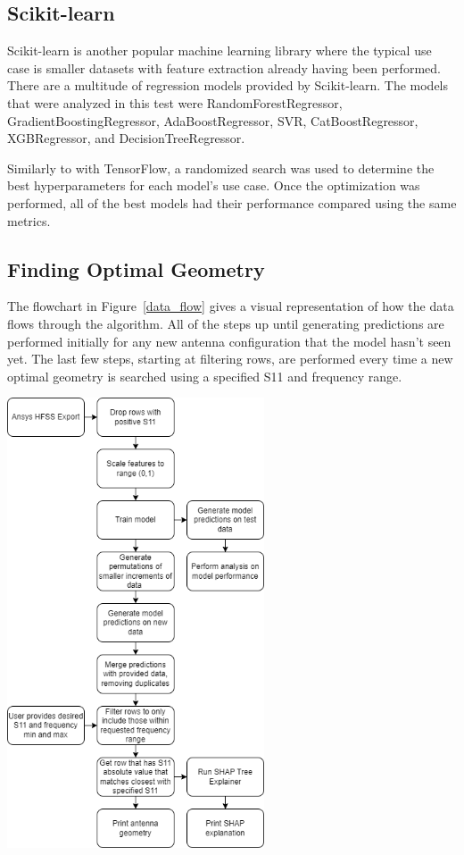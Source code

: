 \documentclass[lettersize,journal]{IEEEtran}
\newenvironment{Figure}
    {\par\medskip\noindent\minipage{\linewidth}}
    {\endminipage\par\medskip}
\begin{document}
\subsection{Scikit-learn}
Scikit-learn is another popular machine learning library where the typical use case is smaller datasets with feature extraction already having been performed. There are a multitude of regression models provided by Scikit-learn. The models that were analyzed in this test were RandomForestRegressor, GradientBoostingRegressor, AdaBoostRegressor, SVR, CatBoostRegressor, XGBRegressor, and DecisionTreeRegressor.

Similarly to with TensorFlow, a randomized search was used to determine the best hyperparameters for each model's use case. Once the optimization was performed, all of the best models had their performance compared using the same metrics. 

\subsection{Finding Optimal Geometry}
The flowchart in Figure~\ref{data_flow} gives a visual representation of how the data flows through the algorithm. All of the steps up until generating predictions are performed initially for any new antenna configuration that the model hasn't seen yet. The last few steps, starting at filtering rows, are performed every time a new optimal geometry is searched using a specified S11 and frequency range. 

\begin{Figure}
\centering
\includegraphics[width=3.0in]{methodology}
\label{data_flow}
\end{Figure}
\end{document}
